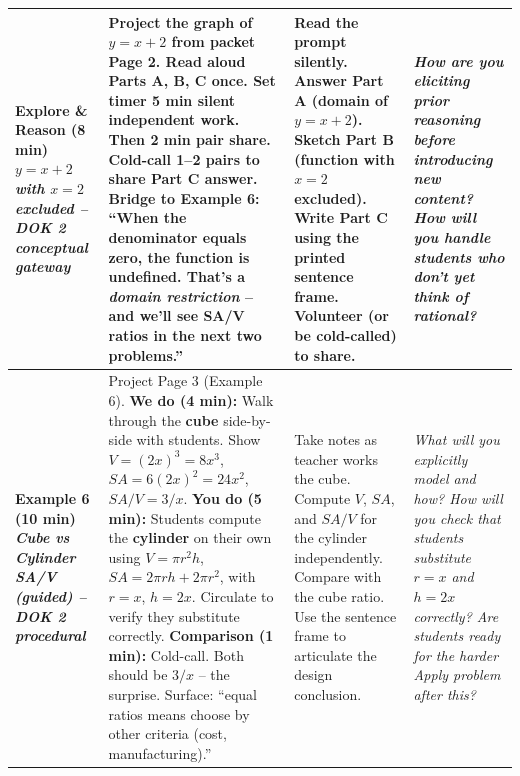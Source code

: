\documentclass[10pt]{article}
\begin{document}
\begin{xltabular}{\linewidth}{|>{\bfseries\RaggedRight\arraybackslash}p{1.4in}|Y|>{\RaggedRight\arraybackslash}p{1.9in}|>{\itshape\RaggedRight\arraybackslash}p{1.55in}|}
  Explore \& Reason (8 min) \newline
  \emph{$y=x+2$ with $x = 2$ excluded -- DOK 2 conceptual gateway}
  &
  Project the graph of $y = x+2$ from packet Page 2.     \newline
  Read aloud Parts A, B, C once. Set timer 5 min silent independent work.     \newline
  Then 2 min pair share. Cold-call 1--2 pairs to share Part C answer.     \newline\smallskip
  \textbf{Bridge to Example 6:} ``When the denominator equals zero, the function is undefined. That's a \emph{domain restriction} -- and we'll see SA/V ratios in the next two problems.''
  &
  Read the prompt silently.     \newline
  Answer Part A (domain of $y = x+2$).     \newline
  Sketch Part B (function with $x = 2$ excluded).     \newline
  Write Part C using the printed sentence frame.     \newline
  Volunteer (or be cold-called) to share.
  &
  How are you eliciting prior reasoning before introducing new content?     \newline
  How will you handle students who don't yet think of \emph{rational}? \\ \hline

  Example 6 (10 min) \newline
  \emph{Cube vs Cylinder SA/V (guided) -- DOK 2 procedural}
  &
  Project Page 3 (Example 6).     \newline
  \textbf{We do (4 min):} Walk through the \textbf{cube} side-by-side with students. Show $V = (2x)^3 = 8x^3$, $SA = 6(2x)^2 = 24x^2$, $SA/V = 3/x$.     \newline
  \textbf{You do (5 min):} Students compute the \textbf{cylinder} on their own using $V = \pi r^2 h$, $SA = 2\pi rh + 2\pi r^2$, with $r = x$, $h = 2x$. Circulate to verify they substitute correctly.     \newline
  \textbf{Comparison (1 min):} Cold-call. Both should be $3/x$ -- the surprise. Surface: ``equal ratios means choose by other criteria (cost, manufacturing).''
  &
  Take notes as teacher works the cube.     \newline
  Compute $V$, $SA$, and $SA/V$ for the cylinder independently.     \newline
  Compare with the cube ratio.     \newline
  Use the sentence frame to articulate the design conclusion.
  &
  What will you explicitly model and how?     \newline
  How will you check that students substitute $r = x$ and $h = 2x$ correctly?     \newline
  Are students ready for the harder Apply problem after this? \\ \hline


\end{xltabular}
\end{document}
